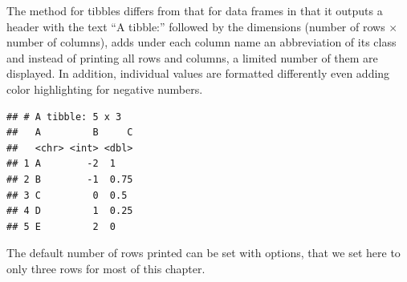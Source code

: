\documentclass[krantz2]{krantz}\usepackage{knitr}
\begin{document}
\begin{explainbox}
  The  method for tibbles differs from that for data frames in that it outputs a header with the text ``A tibble:'' followed by the dimensions (number of rows $\times$ number of columns), adds under each column name an abbreviation of its class and instead of printing all rows and columns, a limited number of them are displayed. In addition, individual values are formatted differently even adding color highlighting for negative numbers.

\begin{knitrout}\footnotesize
{}\color{fgcolor}\begin{kframe}
\begin{alltt}
\hlstd{(} \hlstd{= LETTERS[}\hlopt{:}\hlstd{],}  \hlstd{=} \hlopt{-}\hlopt{:}\hlstd{,}  \hlstd{=} \hlstd{(} \hlstd{=} \hlstd{,}  \hlstd{=} \hlstd{,}  \hlstd{=} \hlstd{))}
\end{alltt}
\begin{verbatim}
## # A tibble: 5 x 3
##   A         B     C
##   <chr> <int> <dbl>
## 1 A        -2  1   
## 2 B        -1  0.75
## 3 C         0  0.5 
## 4 D         1  0.25
## 5 E         2  0
\end{verbatim}
\end{kframe}
\end{knitrout}

The default number of rows printed can be set with options, that we set here to only three rows for most of this chapter.

\begin{knitrout}\footnotesize
{}\color{fgcolor}\begin{kframe}
\begin{alltt}
\hlstd{(} \hlstd{=} \hlstd{,}  \hlstd{=} \hlstd{)}
\end{alltt}
\end{kframe}
\end{knitrout}
\end{explainbox}
\end{document}

